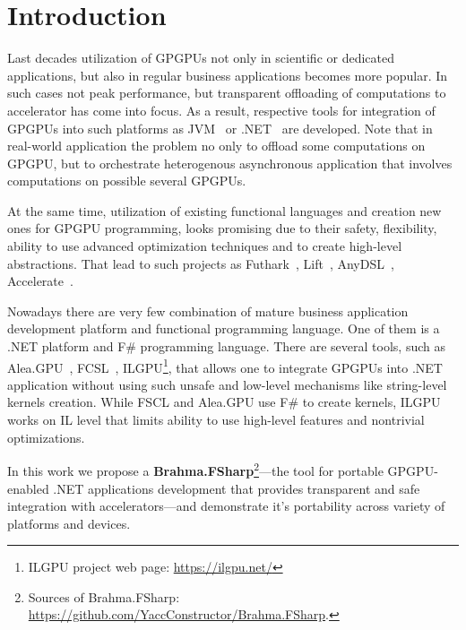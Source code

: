 \section{Introduction}

Last decades utilization of GPGPUs not only in scientific or dedicated applications, but also in regular business applications becomes more popular.
In such cases not peak performance, but transparent offloading of computations to accelerator has come into focus.
As a result, respective tools for integration of GPGPUs into such platforms as JVM~\cite{rootbeer,jcuda,ScalaGPU} or .NET~\cite{FSCLPhD,aleaGPUasync} are developed.
Note that in real-world application the problem no only to offload some computations on GPGPU, but to orchestrate heterogenous asynchronous application that involves computations on possible several GPGPUs.

At the same time, utilization of existing functional languages and creation new ones for GPGPU programming, looks promising due to their safety, flexibility, ability to use advanced optimization techniques and to create high-level abstractions.
That lead to such projects as Futhark~\cite{10.1145/3140587.3062354}, Lift~\cite{10.5555/3049832.3049841}, AnyDSL~\cite{10.1145/3276489}, Accelerate~\cite{10.1145/1926354.1926358}.
 
Nowadays there are very few combination of mature business application development platform and functional programming language.
One of them is a .NET platform and F\# programming language. 
There are several tools, such as Alea.GPU~\cite{aleaGPUasync}, FCSL~\cite{FSCLPhD}, ILGPU\footnote{ILGPU project web page: \url{https://ilgpu.net/}}, that allows one to integrate GPGPUs into .NET application without using such unsafe and low-level mechanisms like string-level kernels creation. 
While FSCL and Alea.GPU use F\# to create kernels, ILGPU works on IL level that limits ability to use high-level features and nontrivial optimizations.
 
In this work we propose a \textbf{Brahma.FSharp}\footnote{
    Sources of Brahma.FSharp: \url{https://github.com/YaccConstructor/Brahma.FSharp}.
}---the tool for portable GPGPU-enabled .NET applications development that provides transparent and safe integration with accelerators---and demonstrate it's portability across variety of platforms and devices. 